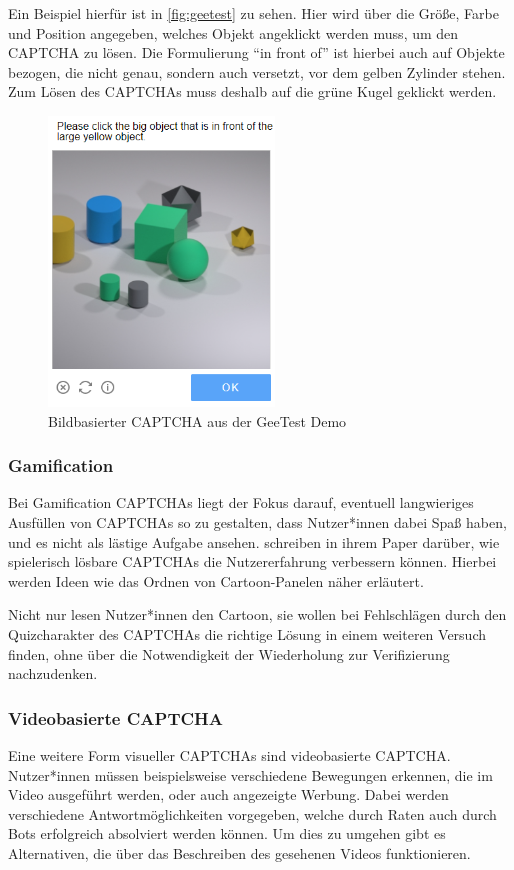 Ein Beispiel hierfür ist in \autoref{fig:geetest} zu sehen.
Hier wird über die Größe, Farbe und Position angegeben, welches Objekt angeklickt werden muss, um den CAPTCHA zu lösen.
Die Formulierung ``in front of'' ist hierbei auch auf Objekte bezogen, die nicht genau, sondern auch versetzt, vor dem gelben Zylinder stehen.
Zum Lösen des CAPTCHAs muss deshalb auf die grüne Kugel geklickt werden.

\begin{figure}[h!]
        \centering
        \includegraphics[width=6cm]{gfx/mygraphics/raeumlich.png} 
    \caption{Bildbasierter CAPTCHA aus der GeeTest Demo}
    \label{fig:geetest}
\end{figure}

\subsubsection*{Gamification}
Bei Gamification CAPTCHAs liegt der Fokus darauf, eventuell langwieriges Ausfüllen von CAPTCHAs so zu gestalten, dass Nutzer*innen dabei Spaß haben,
und es nicht als lästige Aufgabe ansehen.
\citeauthor{gamified} schreiben in ihrem Paper  darüber, wie spielerisch lösbare CAPTCHAs die Nutzererfahrung verbessern können.
Hierbei werden Ideen wie das Ordnen von Cartoon-Panelen näher erläutert.
\pagebreak

Nicht nur lesen Nutzer*innen den Cartoon, sie wollen bei Fehlschlägen durch den Quizcharakter des CAPTCHAs die richtige Lösung in einem weiteren Versuch finden,
ohne über die Notwendigkeit der Wiederholung zur Verifizierung nachzudenken. \cite[p.41ff]{gamified}


\subsubsection*{Videobasierte CAPTCHA}
Eine weitere Form visueller CAPTCHAs sind videobasierte CAPTCHA. 
Nutzer*innen müssen beispielsweise verschiedene Bewegungen erkennen, die im Video ausgeführt werden,
oder auch angezeigte Werbung.
Dabei werden verschiedene Antwortmöglichkeiten vorgegeben, welche durch Raten auch durch Bots erfolgreich absolviert werden können.
Um dies zu umgehen gibt es Alternativen, die über das Beschreiben des gesehenen Videos funktionieren. \cite[p.xx]{surveyofresearch} 

